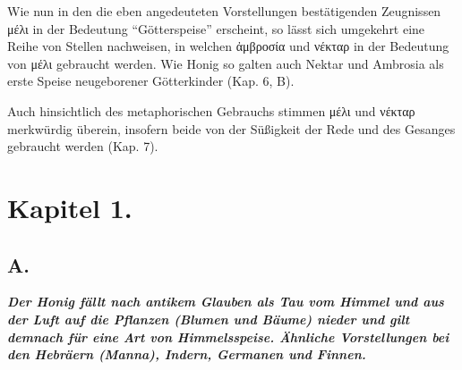 \documentclass[a4paper, 11pt, oneside]{article}
\begin{document}
Wie nun in den die eben angedeuteten Vorstellungen bestätigenden Zeugnissen μέλι in der Bedeutung "`Götterspeise"' erscheint, so lässt sich umgekehrt eine Reihe von Stellen nachweisen, in welchen ἀμβροσία und νέκταρ in der Bedeutung von μέλι gebraucht werden. Wie Honig so galten auch Nektar und Ambrosia als erste Speise neugeborener Götterkinder (Kap. 6, B).

Auch hinsichtlich des metaphorischen Gebrauchs stimmen μέλι und νέκταρ merkwürdig überein, insofern beide von der Süßigkeit der Rede und des Gesanges gebraucht werden (Kap. 7).
\clearpage
\section{Kapitel 1.}
\subsection{A.}
\begin{center}
\textbf{\emph{Der Honig fällt nach antikem Glauben als Tau vom Himmel und aus der Luft auf die Pflanzen (Blumen und Bäume) nieder und gilt demnach für eine Art von Himmelsspeise. Ähnliche Vorstellungen bei den Hebräern (Manna), Indern, Germanen und Finnen.}}
\end{center}
\end{document}
